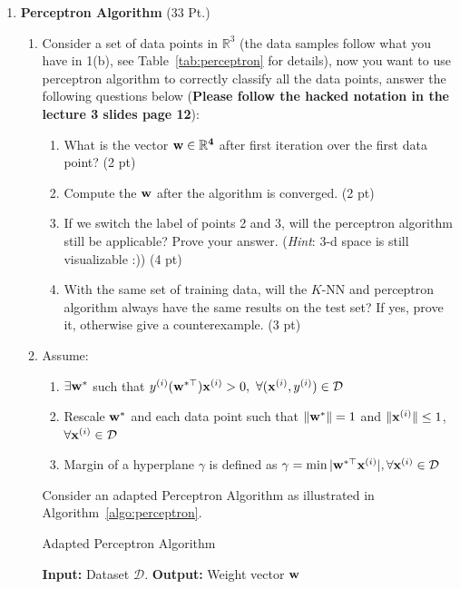 \documentclass{article}
\theoremstyle{definition}
\theoremstyle{remark}
\newenvironment{Q}
        {%
          \clearpage
          \item
        }
        {%
          \phantom{s} 
          \bigskip
        }
\begin{document}
\begin{enumerate}[font={\Large\bfseries},left=0pt]
\begin{tcolorbox}
\begin{enumerate}
        \end{enumerate}
    \end{tcolorbox}

\begin{Q}
\textbf{\Large Perceptron Algorithm} (33 Pt.)
\begin{enumerate}
    \item Consider a set of data points in $\mathbb{R}^3$ (the data samples follow
what you have in 1(b), see Table~\ref{tab:perceptron} for details)\label{}, now you want to use perceptron algorithm to correctly classify all the data points, answer the following questions below (\textbf{Please follow the hacked notation in the lecture 3 slides page 12}):
      
      \begin{enumerate}
          \item    What is the vector $\bf{w} \in \mathbb{R}^4$ after first iteration over the first data point? (2 pt)
          \item    Compute the $\bf{w}$ after the algorithm is converged. (2 pt)
          \item    If we switch the label of points 2 and 3, will the perceptron algorithm still be applicable? Prove your answer. (\textit{Hint}: 3-d space is still visualizable :)) (4 pt)
        \item With the same set of training data, will the $K$-NN and perceptron algorithm always have the same results on the test set? If yes, prove it, otherwise give a counterexample. (3 pt)
      \end{enumerate}


     \item 
    Assume:
    \begin{enumerate}
    \item $\exists {\bf w}^*$ such that $y^{(i)}({\bf w}^{*\top}){\bf x}^{(i)}>0,\ \forall ({\bf x}^{(i)}, y^{(i)})\in\mathcal{D}$
\item Rescale ${\bf w}^*$ and each data point such that $\|{\bf w}^*\|=1$ and $\|{\bf x}^{(i)}\|\leq 1$, $\forall {\bf x}^{(i)}\in\mathcal{D}$
\item Margin of a hyperplane $\gamma$ is defined as $\gamma=\min | {\bf w}^{*\top}{\bf x}^{(i)}|, \forall {\bf x}^{(i)}\in\mathcal{D}$
    \end{enumerate}
    Consider an adapted Perceptron Algorithm as illustrated in Algorithm~\ref{algo:perceptron}. 

    
    \begin{algorithm}
    \caption{Adapted Perceptron Algorithm}
    \label{algo:perceptron}
    \begin{algorithmic}[1]
    \STATE \textbf{Input:} Dataset $\mathcal{D}$.
    \STATE \textbf{Output:} Weight vector ${\bf w}$


\end{algorithmic}
\end{algorithm}
\end{enumerate}
\end{Q}
\end{enumerate}
\end{document}
